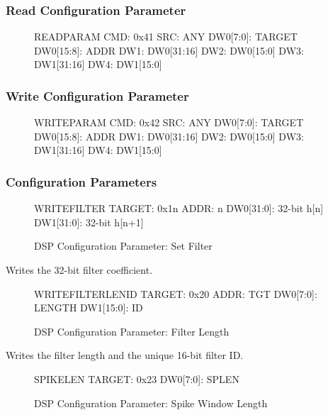 \subsubsection{Read Configuration Parameter}

\begin{figure}[h]
\begin{event}{READPARAM}
CMD: 0x41
SRC: ANY
DW0[7:0]: TARGET
DW0[15:8]: ADDR
DW1: DW0[31:16]
DW2: DW0[15:0]
DW3: DW1[31:16]
DW4: DW1[15:0]
\end{event}
\end{figure}

\subsubsection{Write Configuration Parameter}
\begin{figure}[h]
\begin{event}{WRITEPARAM}
CMD: 0x42
SRC: ANY
DW0[7:0]: TARGET
DW0[15:8]: ADDR
DW1: DW0[31:16]
DW2: DW0[15:0]
DW3: DW1[31:16]
DW4: DW1[15:0]
\end{event}
\end{figure}

\subsubsection{Configuration Parameters}

\begin{figure}[h]
\begin{dspcmd}{WRITEFILTER}
TARGET: 0x1n
ADDR: n
DW0[31:0]: 32-bit h[n]
DW1[31:0]: 32-bit h[n+1]
\end{dspcmd}
\caption{DSP Configuration Parameter: Set Filter}
\end{figure}

Writes the 32-bit filter coefficient. 

\begin{figure}[h]
\begin{dspcmd}{WRITEFILTERLENID}
TARGET: 0x20
ADDR: TGT
DW0[7:0]: LENGTH
DW1[15:0]: ID
\end{dspcmd}
\caption{DSP Configuration Parameter: Filter Length}
\end{figure}
Writes the filter length and the unique 16-bit filter ID. 


\begin{figure}[h]
\begin{dspcmd}{SPIKELEN}
TARGET: 0x23
DW0[7:0]: SPLEN
\end{dspcmd}
\caption{DSP Configuration Parameter: Spike Window Length}
\end{figure}

